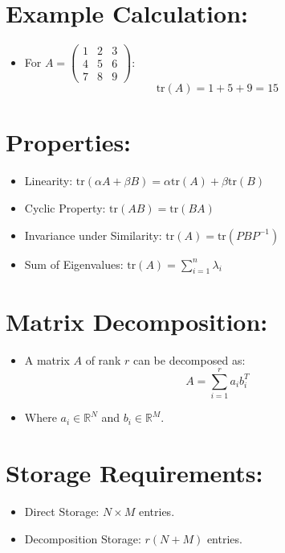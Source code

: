 \documentclass{article}
\begin{document}
\section{Example Calculation:}
\begin{itemize}
    \item For $A = \begin{pmatrix}
    1 & 2 & 3 \\
    4 & 5 & 6 \\
    7 & 8 & 9
    \end{pmatrix}$:
    \[
    \text{tr}(A) = 1 + 5 + 9 = 15
    \]
\end{itemize}

\section{Properties:}
\begin{itemize}
    \item Linearity: $\text{tr}(\alpha A + \beta B) = \alpha \text{tr}(A) + \beta \text{tr}(B)$
    \item Cyclic Property: $\text{tr}(AB) = \text{tr}(BA)$
    \item Invariance under Similarity: $\text{tr}(A) = \text{tr}(PBP^{-1})$
    \item Sum of Eigenvalues: $\text{tr}(A) = \sum_{i=1}^{n} \lambda_i$
\end{itemize}




\section{Matrix Decomposition:}

\begin{itemize}
    \item A matrix $A$ of rank $r$ can be decomposed as:
    \[
    A = \sum_{i=1}^{r} a_i b_i^T
    \]
    \item Where $a_i \in \mathbb{R}^N$ and $b_i \in \mathbb{R}^M$.
\end{itemize}

\section{Storage Requirements:}

\begin{itemize}
    \item Direct Storage: $N \times M$ entries.
    \item Decomposition Storage: $r(N + M)$ entries.
\end{itemize}
\end{document}
